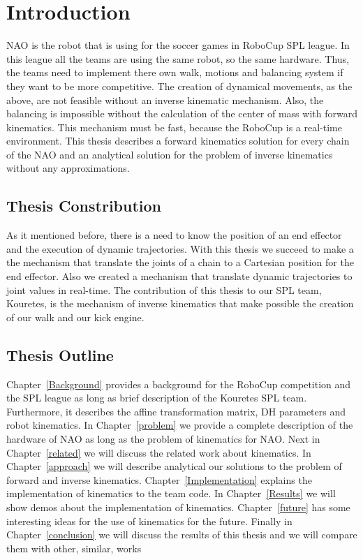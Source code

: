 \chapter{Introduction}
\label{intro}
NAO is the robot that is using for the soccer games in RoboCup SPL league. In this league all the teams are using the same robot, so the same hardware. Thus, the teams need to implement there own walk, motions and balancing system if they want to be more competitive. The creation of dynamical movements, as the above, are not feasible without an inverse kinematic mechanism. Also, the balancing is impossible without the calculation of the center of mass with forward kinematics. This mechanism must be fast, because the RoboCup is a real-time environment. This thesis describes a forward kinematics solution for every chain of the NAO and an analytical solution for the problem of inverse kinematics without any approximations.

\section{Thesis Constribution}
As it mentioned before, there is a need to know the position of an end effector and the execution of dynamic trajectories. With this thesis we succeed to make a the mechanism that translate the joints of a chain to a Cartesian position for the end effector. Also we created a mechanism that translate dynamic trajectories to joint values in real-time. The contribution of this thesis to our SPL team, Kouretes, is the mechanism of inverse kinematics that make possible the creation of our walk and our kick engine.

\section{Thesis Outline}
Chapter~\ref{Background} provides a background for the RoboCup competition and the SPL league as long as brief description of the Kouretes SPL team. Furthermore, it describes the affine transformation matrix, DH parameters and robot kinematics. In Chapter~\ref{problem} we provide a complete description of the hardware of NAO as long as the problem of kinematics for NAO. Next in Chapter~\ref{related} we will discuss the related work about kinematics. In Chapter~\ref{approach} we will describe analytical our solutions to the problem of forward and inverse kinematics. Chapter~\ref{Implementation} explains the implementation of kinematics to the team code. In Chapter~\ref{Results} we will show demos about the implementation of kinematics. Chapter~\ref{future} has some interesting ideas for the use of kinematics for the future. Finally in Chapter~\ref{conclusion} we will discuss the results of this thesis and we will compare them with other, similar, works

